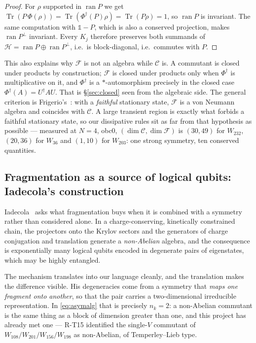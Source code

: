\documentclass[11pt]{article}
\newcommand{\Tr}{\operatorname{Tr}}
\newcommand{\Phid}{\Phi^{\dagger}}
\theoremstyle{plain}
\theoremstyle{definition}
\theoremstyle{remark}
\begin{document}
\begin{proof}
For $\rho$ supported in $\operatorname{ran}P$ we get $\Tr(P\,\Phi(\rho)) =
\Tr(\Phid(P)\rho) = \Tr(P\rho) = 1$, so $\operatorname{ran}P$ is invariant. The
same computation with $\mathbb{1}-P$, which is also a conserved projection,
makes $\operatorname{ran}P^\perp$ invariant. Every $K_j$ therefore preserves
both summands of $\mathcal{H} = \operatorname{ran}P \oplus
\operatorname{ran}P^\perp$, i.e.\ is block-diagonal, i.e.\ commutes with $P$.
\end{proof}

This also explains why $\mathcal{F}$ is not an algebra while $\mathcal{C}$ is.
A commutant is closed under products by construction; $\mathcal{F}$ is closed
under products only when $\Phid$ is multiplicative on it, and $\Phid$ is a
$*$-automorphism precisely in the closed case $\Phid(A) = U^\dagger A U$. That
is \S\ref{sec:closed} seen from the algebraic side. The general criterion is
Frigerio's~\cite{frigerio1978}: with a \emph{faithful} stationary state,
$\mathcal{F}$ is a von Neumann algebra and coincides with $\mathcal{C}$. A large
transient region is exactly what forbids a faithful stationary state, so our
dissipative rules sit as far from that hypothesis as possible --- measured at
$N=4$, obc0, $(\dim\mathcal{C}, \dim\mathcal{F})$ is $(30,49)$ for $W_{232}$,
$(20,36)$ for $W_{36}$ and $(1,10)$ for $W_{203}$: one strong symmetry, ten
conserved quantities.

\subsection{Fragmentation as a source of logical qubits: Iadecola's construction}

Iadecola~\cite{iadecola2026} asks what fragmentation buys when it is combined
with a symmetry rather than considered alone. In a charge-conserving,
kinetically constrained chain, the projectors onto the Krylov sectors and the
generators of charge conjugation and translation generate a \emph{non-Abelian}
algebra, and the consequence is exponentially many logical qubits encoded in
degenerate pairs of eigenstates, which may be highly entangled.

The mechanism translates into our language cleanly, and the translation makes
the difference visible. His degeneracies come from a symmetry that \emph{maps
one fragment onto another}, so that the pair carries a two-dimensional
irreducible representation. In \eqref{eq:asymalg} that is precisely $n_k = 2$:
a non-Abelian commutant is the same thing as a block of dimension greater than
one, and this project has already met one --- R-T15 identified the single-$V$
commutant of $W_{108}/W_{201}/W_{156}/W_{198}$ as non-Abelian, of
Temperley--Lieb type.
\end{document}
